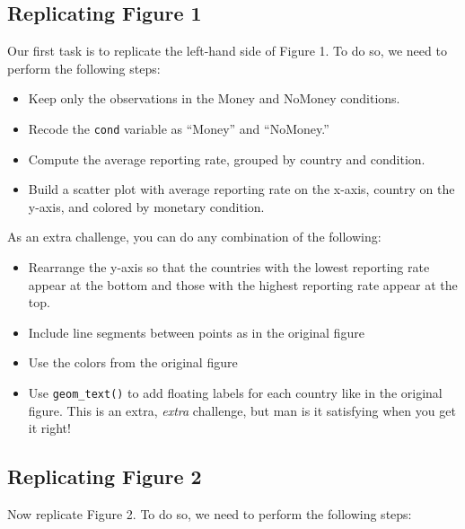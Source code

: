 \documentclass[12pt,halfline,a4paper,]{ouparticle}
\providecommand{\tightlist}{%
  \setlength{\itemsep}{0pt}\setlength{\parskip}{0pt}}
\begin{document}
\hypertarget{replicating-figure-1}{%
\subsection{Replicating Figure 1}\label{replicating-figure-1}}

Our first task is to replicate the left-hand side of Figure 1. To do so,
we need to perform the following steps:

\begin{itemize}
\tightlist
\item
  Keep only the observations in the Money and NoMoney conditions.
\item
  Recode the \texttt{cond} variable as ``Money'' and ``NoMoney.''
\item
  Compute the average reporting rate, grouped by country and condition.
\item
  Build a scatter plot with average reporting rate on the x-axis,
  country on the y-axis, and colored by monetary condition.
\end{itemize}

\noindent As an extra challenge, you can do any combination of the
following:

\begin{itemize}
\tightlist
\item
  Rearrange the y-axis so that the countries with the lowest reporting
  rate appear at the bottom and those with the highest reporting rate
  appear at the top.
\item
  Include line segments between points as in the original figure
\item
  Use the colors from the original figure
\item
  Use \texttt{geom\_text()} to add floating labels for each country like
  in the original figure. This is an extra, \emph{extra} challenge, but
  man is it satisfying when you get it right!
\end{itemize}

\hypertarget{replicating-figure-2}{%
\subsection{Replicating Figure 2}\label{replicating-figure-2}}

Now replicate Figure 2. To do so, we need to perform the following
steps:
\end{document}
